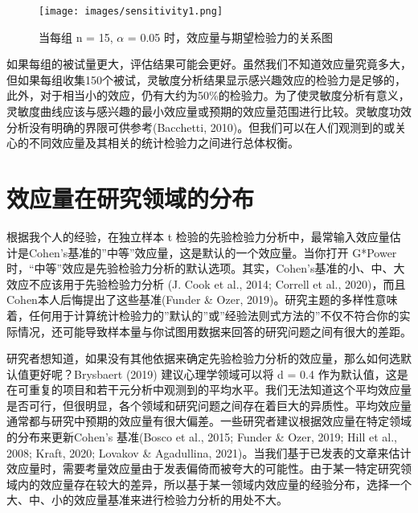 \documentclass[
  letterpaper,
  DIV=11,
  numbers=noendperiod]{scrreprt}
\begin{document}
\begin{figure}

{\centering \texttt{[image: images/sensitivity1.png]}

}

\caption{\label{fig-gsens1}当每组 n = 15, \(\alpha\) = 0.05
时，效应量与期望检验力的关系图}

\end{figure}

如果每组的被试量更大，评估结果可能会更好。虽然我们不知道效应量究竟多大，但如果每组收集150个被试，灵敏度分析结果显示感兴趣效应的检验力是足够的，此外，对于相当小的效应，仍有大约为50\%的检验力。为了使灵敏度分析有意义，灵敏度曲线应该与感兴趣的最小效应量或预期的效应量范围进行比较。灵敏度功效分析没有明确的界限可供参考(Bacchetti,
2010)。但我们可以在人们观测到的或关心的不同效应量及其相关的统计检验力之间进行总体权衡。

\hypertarget{ux6548ux5e94ux91cfux5728ux7814ux7a76ux9886ux57dfux7684ux5206ux5e03}{%
\section{效应量在研究领域的分布}\label{ux6548ux5e94ux91cfux5728ux7814ux7a76ux9886ux57dfux7684ux5206ux5e03}}

根据我个人的经验，在独立样本 t
检验的先验检验力分析中，最常输入效应量估计是Cohen's基准的''中等''效应量，这是默认的一个效应量。当你打开
G*Power
时，``中等''效应是先验检验力分析的默认选项。其实，Cohen's基准的小、中、大效应不应该用于先验检验力分析
(J. Cook et al., 2014; Correll et al.,
2020)，而且Cohen本人后悔提出了这些基准(Funder \& Ozer,
2019)。研究主题的多样性意味着，任何用于计算统计检验力的''默认的''或''经验法则式方法的''不仅不符合你的实际情况，还可能导致样本量与你试图用数据来回答的研究问题之间有很大的差距。

研究者想知道，如果没有其他依据来确定先验检验力分析的效应量，那么如何选默认值更好呢？Brysbaert
(2019) 建议心理学领域可以将 d = 0.4
作为默认值，这是在可重复的项目和若干元分析中观测到的平均水平。我们无法知道这个平均效应量是否可行，但很明显，各个领域和研究问题之间存在着巨大的异质性。平均效应量通常都与研究中预期的效应量有很大偏差。一些研究者建议根据效应量在特定领域的分布来更新Cohen's
基准(Bosco et al., 2015; Funder \& Ozer, 2019; Hill et al., 2008; Kraft,
2020; Lovakov \& Agadullina,
2021)。当我们基于已发表的文章来估计效应量时，需要考量效应量由于发表偏倚而被夸大的可能性。由于某一特定研究领域内的效应量存在较大的差异，所以基于某一领域内效应量的经验分布，选择一个大、中、小的效应量基准来进行检验力分析的用处不大。
\end{document}
